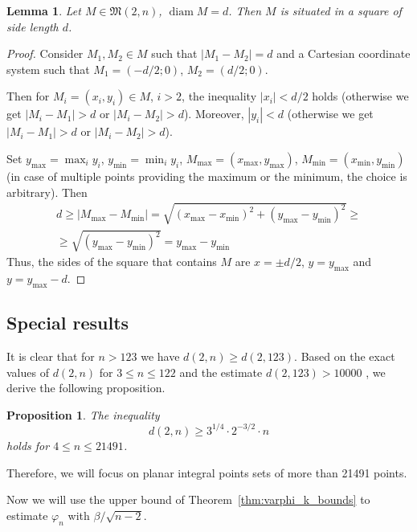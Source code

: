 \documentclass[a4paper,14pt]{article} %
\theoremstyle{plain}
\newtheorem{lemma}[theorem]{Lemma}
\newtheorem{proposition}[theorem]{Proposition}
\theoremstyle{definition}
\begin{document}
\begin{lemma}
	\cite[Lemma 4]{our-vmmsh-2018-translit}
	\label{lem:square_container}
	Let $M\in\mathfrak{M}(2,n)$, $\operatorname{diam} M = d$.
	Then $M$ is situated in a square of side length $d$.
\end{lemma}

\begin{proof}
	Consider $M_1, M_2 \in M$ such that $|M_1 - M_2| = d$
	and a Cartesian coordinate system such that
	$M_1 = (-d/2; 0)$, $M_2 = (d/2; 0)$.

	Then for $M_i =(x_i, y_i)\in M$, $i > 2$,
	the inequality $|x_i| < d/2$ holds
	(otherwise we get $|M_i - M_1| > d$ or $|M_i - M_2| > d$).
	Moreover, $|y_i| < d$ (otherwise we get $|M_i - M_1| > d$ or $|M_i - M_2| > d$).

	Set $y_{\max} = \max_{i} y_i$, $y_{\min} = \min_{i} y_i$, $M_{\max}=(x_{\max}, y_{\max})$, $M_{\min}=(x_{\min}, y_{\min})$
	(in case of multiple points providing the maximum or the minimum, the choice is arbitrary).
	Then
	\begin{multline}
		d \geq |M_{\max} - M_{\min}| = \sqrt{(x_{\max} - x_{\min})^2 + (y_{\max} - y_{\min})^2}
		\geq
		\\\geq
		\sqrt{(y_{\max} - y_{\min})^2} =
		y_{\max} - y_{\min}
	\end{multline}
	Thus, the sides of the square that contains $M$ are $x=\pm d/2$,
	$y=y_{\max}$ and $y=y_{\max} - d$.
\end{proof}

\subsection{Special results}

It is clear that for $n>123$ we have $d(2,n) \geq d(2,123)$.
Based on the exact values of $d(2,n)$ for $ 3 \leq n\leq 122$ and the estimate $d(2,123)>10000$
\cite{kurz2008bounds}, we derive the following proposition.
\begin{proposition}
	\label{obs:4_leq_n_leq_21491}
	The inequality
	\begin{equation}
		d(2,n) \geq 3^{1/4}\cdot2^{-3/2} \cdot n
	\end{equation}
	holds for $4 \leq n \leq 21491$.
\end{proposition}

Therefore, we will focus on planar integral points sets of more than 21491 points.


Now we will use the upper bound of Theorem~\ref{thm:varphi_k_bounds}
to estimate $\varphi_n$ with $\beta/\sqrt{n-2}$.
\end{document}
